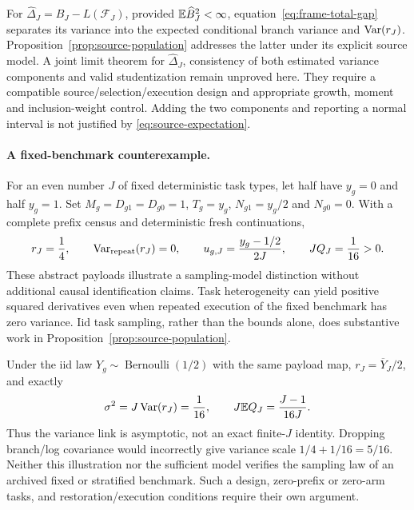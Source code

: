 For $\widehat\Delta_J=\widehat B_J-L(\mathcal F_J)$, provided $\mathbb{E}\widehat B_J^2<\infty$, equation~\eqref{eq:frame-total-gap} separates its variance into the expected conditional branch variance and $\operatorname{Var}(r_J)$. Proposition~\ref{prop:source-population} addresses the latter under its explicit source model. A joint limit theorem for $\widehat\Delta_J$, consistency of both estimated variance components and valid studentization remain unproved here. They require a compatible source/selection/execution design and appropriate growth, moment and inclusion-weight control. Adding the two components and reporting a normal interval is not justified by \eqref{eq:source-expectation}.

\paragraph{A fixed-benchmark counterexample.}
For an even number $J$ of fixed deterministic task types, let half have $y_g=0$ and half $y_g=1$. Set $M_g=D_{g1}=D_{g0}=1$, $T_g=y_g$, $N_{g1}=y_g/2$ and $N_{g0}=0$. With a complete prefix census and deterministic fresh continuations,
\begin{equation}
 r_J=\frac14,\qquad \operatorname{Var}_{\mathrm{repeat}}(r_J)=0,\qquad
 u_{g,J}=\frac{y_g-1/2}{2J},\qquad JQ_J=\frac1{16}>0.
 \label{eq:source-fixed-counterexample}
\end{equation}
These abstract payloads illustrate a sampling-model distinction without additional causal identification claims. Task heterogeneity can yield positive squared derivatives even when repeated execution of the fixed benchmark has zero variance. Iid task sampling, rather than the bounds alone, does substantive work in Proposition~\ref{prop:source-population}.

Under the iid law $Y_g\sim\operatorname{Bernoulli}(1/2)$ with the same payload map, $r_J=\overline Y_J/2$, and exactly
\[
 \sigma^2=J\operatorname{Var}(r_J)=\frac1{16},\qquad J\mathbb{E} Q_J=\frac{J-1}{16J}.
\]
Thus the variance link is asymptotic, not an exact finite-$J$ identity. Dropping branch/log covariance would incorrectly give variance scale $1/4+1/16=5/16$. Neither this illustration nor the sufficient model verifies the sampling law of an archived fixed or stratified benchmark. Such a design, zero-prefix or zero-arm tasks, and restoration/execution conditions require their own argument.
